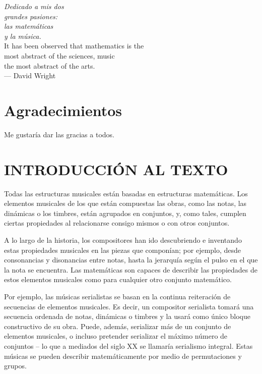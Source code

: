 \pagestyle{plain}
\thispagestyle{empty}

	\vspace*{\bigskipamount}
	\begin{flushright}
		\textit{Dedicado a mis dos \\
			grandes pasiones: \\
			las matemáticas \\
			y la música.} \\
		
		\vfill
		It has been observed that mathematics is the\\
		most abstract of the sciences, music\\
		the most abstract of the arts.\\
		\bigskip
		 --- David Wright \cite{wright}
	\end{flushright}
	
	\chapter*{Agradecimientos}
	
		Me gustaría dar las gracias a todos.
	
	
	\chapter*{INTRODUCCIÓN AL TEXTO}
		Todas las estructuras musicales están basadas en estructuras matemáticas. Los elementos musicales de los que están compuestas las obras, como las notas, las dinámicas o los timbres, están agrupados en conjuntos, y, como tales, cumplen ciertas propiedades al relacionarse consigo mismos o con otros conjuntos.
		
		A lo largo de la historia, los compositores han ido descubriendo e inventando estas propiedades musicales en las piezas que componían; por ejemplo, desde consonancias y disonancias entre notas, hasta la jerarquía según el pulso en el que la nota se encuentra. Las matemáticas son capaces de describir las propiedades de estos elementos musicales como para cualquier otro conjunto matemático.
		
		Por ejemplo, las músicas serialistas se basan en la continua reiteración de secuencias de elementos musicales. Es decir, un compositor serialista tomará una secuencia ordenada de notas, dinámicas o timbres y la usará como único bloque constructivo de su obra. Puede, además, serializar más de un conjunto de elementos musicales, o incluso pretender serializar el máximo número de conjuntos -- lo que a mediados del siglo XX se llamaría serialismo integral. Estas músicas se pueden describir matemáticamente por medio de permutaciones y grupos.
		

